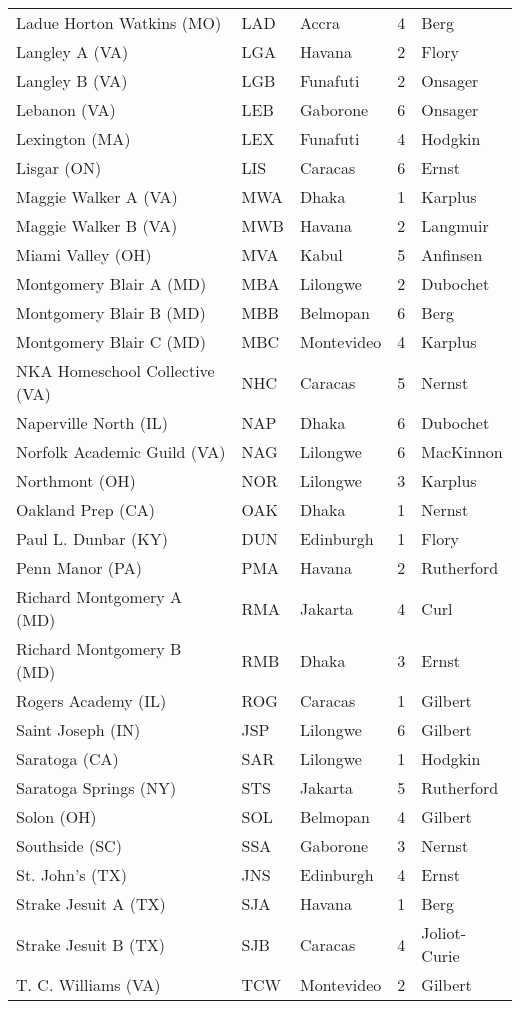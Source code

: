 \documentclass{article}%
\begin{document}
\begin{longtable}{|ll|lc|l|}
Ladue Horton Watkins (MO)&LAD&Accra&4&Berg\\%
Langley A (VA)&LGA&Havana&2&Flory\\%
Langley B (VA)&LGB&Funafuti&2&Onsager\\%
Lebanon (VA)&LEB&Gaborone&6&Onsager\\%
Lexington (MA)&LEX&Funafuti&4&Hodgkin\\%
Lisgar (ON)&LIS&Caracas&6&Ernst\\%
Maggie Walker A (VA)&MWA&Dhaka&1&Karplus\\%
Maggie Walker B (VA)&MWB&Havana&2&Langmuir\\%
Miami Valley (OH)&MVA&Kabul&5&Anfinsen\\%
Montgomery Blair A (MD)&MBA&Lilongwe&2&Dubochet\\%
Montgomery Blair B (MD)&MBB&Belmopan&6&Berg\\%
Montgomery Blair C (MD)&MBC&Montevideo&4&Karplus\\%
NKA Homeschool Collective (VA)&NHC&Caracas&5&Nernst\\%
Naperville North (IL)&NAP&Dhaka&6&Dubochet\\%
Norfolk Academic Guild (VA)&NAG&Lilongwe&6&MacKinnon\\%
Northmont (OH)&NOR&Lilongwe&3&Karplus\\%
Oakland Prep (CA)&OAK&Dhaka&1&Nernst\\%
Paul L. Dunbar (KY)&DUN&Edinburgh&1&Flory\\%
Penn Manor (PA)&PMA&Havana&2&Rutherford\\%
Richard Montgomery A (MD)&RMA&Jakarta&4&Curl\\%
Richard Montgomery B (MD)&RMB&Dhaka&3&Ernst\\%
Rogers Academy (IL)&ROG&Caracas&1&Gilbert\\%
Saint Joseph (IN)&JSP&Lilongwe&6&Gilbert\\%
Saratoga (CA)&SAR&Lilongwe&1&Hodgkin\\%
Saratoga Springs (NY)&STS&Jakarta&5&Rutherford\\%
Solon (OH)&SOL&Belmopan&4&Gilbert\\%
Southside (SC)&SSA&Gaborone&3&Nernst\\%
St. John's (TX)&JNS&Edinburgh&4&Ernst\\%
Strake Jesuit A (TX)&SJA&Havana&1&Berg\\%
Strake Jesuit B (TX)&SJB&Caracas&4&Joliot{-}Curie\\%
T. C. Williams (VA)&TCW&Montevideo&2&Gilbert\\%

\end{longtable}
\end{document}
